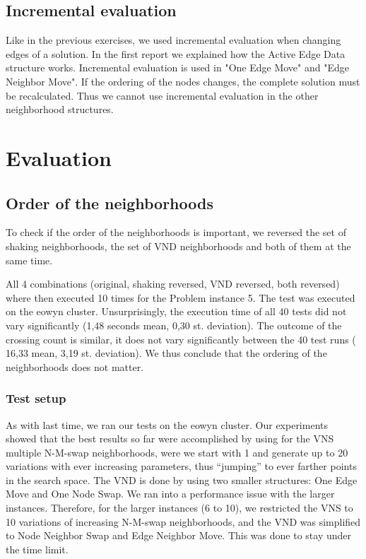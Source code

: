 \documentclass [11pt]{article}
\begin{document}
\subsection{Incremental evaluation}

Like in the previous exercises, we used incremental evaluation when changing edges of a solution. In the first report we explained how the Active Edge Data structure works. Incremental evaluation is used in "One Edge Move" and "Edge Neighbor Move". If the ordering of the nodes changes, the complete solution must be recalculated. Thus we cannot use incremental evaluation in the other neighborhood structures.


\section{Evaluation}

\subsection{Order of the neighborhoods}

To check if the order of the neighborhoods is important, we reversed the set of shaking neighborhoods, the set of VND neighborhoods and both of them at the same time.

All 4 combinations (original, shaking reversed, VND reversed, both reversed) where then executed 10 times for the Problem instance 5. The test was executed on the eowyn cluster. Unsurprisingly, the execution time of all 40 tests did not vary significantly (1,48 seconds mean, 0,30 st. deviation). The outcome of the crossing count is similar, it does not vary significantly between the 40 test runs ( 16,33 mean, 3,19 st. deviation). We thus conclude that the ordering of the neighborhoods does not matter.

\subsubsection{Test setup}
As with last time, we ran our tests on the eowyn cluster. Our experiments showed that the best results so far were accomplished by using for the VNS multiple N-M-swap neighborhoods, were we start with 1 and generate up to 20 variations with ever increasing parameters, thus ``jumping'' to ever farther points in the search space. The VND is done by using two smaller structures:  One Edge Move and One Node Swap. We ran into a performance issue with the larger instances. Therefore, for the larger instances (6 to 10), we restricted the VNS to 10 variations of increasing N-M-swap neighborhoods, and the VND was simplified to Node Neighbor Swap and Edge Neighbor Move. This was done to stay under the time limit. 
\end{document}
